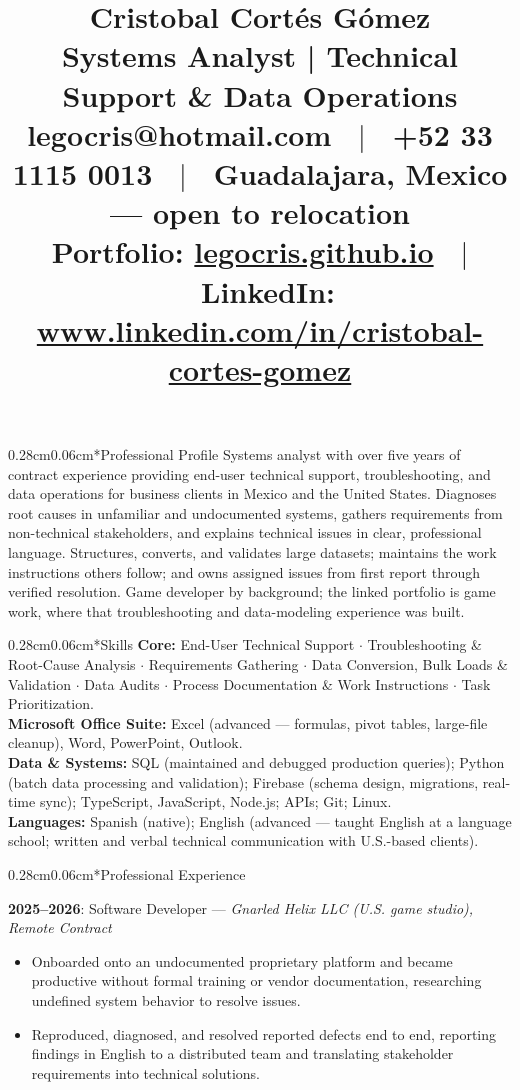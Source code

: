 \documentclass[10.5pt]{article}
\title{\vspace{-1.5cm} \Huge{Cristobal Cortés Gómez} \\ \large{Systems Analyst | Technical Support \& Data Operations} \\
\vspace{0.25cm}
\normalsize{
legocris@hotmail.com \ $|$ \ +52 33 1115 0013 \ $|$ \ Guadalajara, Mexico --- open to relocation \\
Portfolio: \url{legocris.github.io} \ $|$ \ LinkedIn: \url{www.linkedin.com/in/cristobal-cortes-gomez}
}
\vspace{-1cm}}
\author{}
\date{}
\makeatletter
\renewcommand{\section}{\@startsection{section}{1}{0pt}%
  {0.28cm}{0.06cm}{\normalfont\large\bfseries}}
\makeatother
\begin{document}
\pagestyle{empty}

\maketitle
\thispagestyle{empty}

\section*{Professional Profile}
Systems analyst with over five years of contract experience providing end-user technical support, troubleshooting, and data operations for business clients in Mexico and the United States. Diagnoses root causes in unfamiliar and undocumented systems, gathers requirements from non-technical stakeholders, and explains technical issues in clear, professional language. Structures, converts, and validates large datasets; maintains the work instructions others follow; and owns assigned issues from first report through verified resolution. Game developer by background; the linked portfolio is game work, where that troubleshooting and data-modeling experience was built.

\section*{Skills}
\textbf{Core:} End-User Technical Support $\cdot$ Troubleshooting \& Root-Cause Analysis $\cdot$ Requirements Gathering $\cdot$ Data Conversion, Bulk Loads \& Validation $\cdot$ Data Audits $\cdot$ Process Documentation \& Work Instructions $\cdot$ Task Prioritization. \\
\textbf{Microsoft Office Suite:} Excel (advanced --- formulas, pivot tables, large-file cleanup), Word, PowerPoint, Outlook. \\
\textbf{Data \& Systems:} SQL (maintained and debugged production queries); Python (batch data processing and validation); Firebase (schema design, migrations, real-time sync); TypeScript, JavaScript, Node.js; APIs; Git; Linux. \\
\textbf{Languages:} Spanish (native); English (advanced --- taught English at a language school; written and verbal technical communication with U.S.-based clients).

\section*{Professional Experience}

\textbf{2025--2026}: Software Developer --- \textit{Gnarled Helix LLC (U.S. game studio), Remote Contract}
\begin{itemize}
    \item Onboarded onto an undocumented proprietary platform and became productive without formal training or vendor documentation, researching undefined system behavior to resolve issues.
    \item Reproduced, diagnosed, and resolved reported defects end to end, reporting findings in English to a distributed team and translating stakeholder requirements into technical solutions.
\end{itemize}
\end{document}
